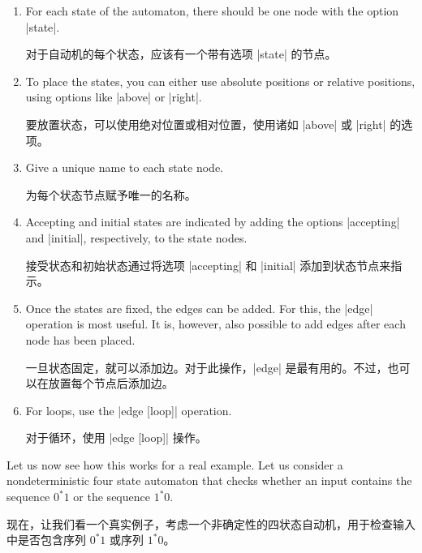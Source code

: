 %
\begin{enumerate}
    \item For each state of the automaton, there should be one node with the
        option |state|.

        对于自动机的每个状态，应该有一个带有选项 |state| 的节点。
    \item To place the states, you can either use absolute positions or
        relative positions, using options like |above| or |right|.

        要放置状态，可以使用绝对位置或相对位置，使用诸如 |above| 或 |right| 的选项。
    \item Give a unique name to each state node.

    为每个状态节点赋予唯一的名称。


    \item Accepting and initial states are indicated by adding the options
        |accepting| and |initial|, respectively, to the state nodes.

        接受状态和初始状态通过将选项 |accepting| 和 |initial| 添加到状态节点来指示。


    \item Once the states are fixed, the edges can be added. For this, the
        |edge| operation is most useful. It is, however, also possible to add
        edges after each node has been placed.

        一旦状态固定，就可以添加边。对于此操作，|edge| 是最有用的。不过，也可以在放置每个节点后添加边。


    \item For loops, use the |edge [loop]| operation.

    对于循环，使用 |edge [loop]| 操作。


\end{enumerate}

Let us now see how this works for a real example. Let us consider a
nondeterministic four state automaton that checks whether an input contains the
sequence $0^*1$ or the sequence $1^*0$.

现在，让我们看一个真实例子，考虑一个非确定性的四状态自动机，用于检查输入中是否包含序列 $0^*1$ 或序列 $1^*0$。


\begin{codeexample}[preamble={\usetikzlibrary{automata,positioning}}]
\end{codeexample}



